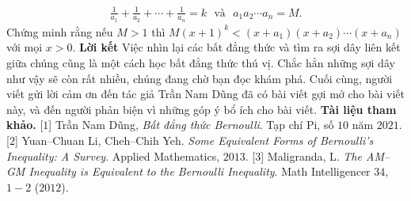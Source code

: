 \begin{multicols}{2}
{\begin{align*}
			\frac{1}{a_1}\!+\!\frac{1}{a_2}\!+\!\cdots\!+\!\frac{1}{a_n}\!=\!k\,\,\text{ và }\,\, a_1a_2\cdots a_n=M.
		\end{align*}
		Chứng minh rằng nếu $M>1$ thì
		$M(x+1)^k <(x+a_1)(x+a_2)\cdots (x+a_n)$ với mọi $ x>0.$}
		\vskip 0.1cm
		\textbf{\color{hoccungpi}Lời kết}
		\vskip 0.1cm
		Việc nhìn lại các bất đẳng thức và tìm ra sợi dây liên kết giữa chúng cũng là một cách học bất đẳng thức  thú vị. Chắc hẳn những sợi dây như vậy sẽ còn rất nhiều, chúng đang chờ bạn đọc khám phá.  Cuối cùng, người viết gửi lời cảm ơn đến tác giả Trần Nam Dũng đã có bài viết gợi mở cho bài viết này, và đến người phản biện vì những góp ý bổ ích cho bài viết.
		\vskip 0.1cm
		\textbf{\color{hoccungpi}Tài liệu tham khảo.}
		\vskip 0.1cm
		[$1$] Trần Nam Dũng, \textit{Bất đẳng thức Bernoulli}. Tạp chí Pi, số $10$ năm $2021$. 
		\vskip 0.1cm
		[$2$] Yuan--Chuan Li, Cheh--Chih Yeh. \textit{Some Equivalent Forms of Bernoulli's Inequality: A Survey}.  Applied Mathematics, $2013$.
		\vskip 0.1cm
		[$3$] Maligranda, L. \textit{The AM--GM Inequality is Equivalent to the Bernoulli Inequality}. Math Intelligencer $34$, $1-2$ ($2012$).
\end{multicols}
